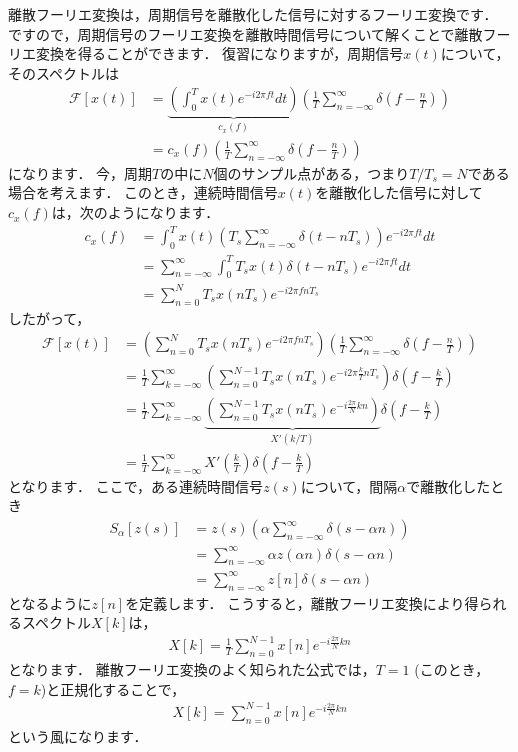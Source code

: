 離散フーリエ変換は，周期信号を離散化した信号に対するフーリエ変換です．
ですので，周期信号のフーリエ変換を離散時間信号について解くことで離散フーリエ変換を得ることができます．
復習になりますが，周期信号$x(t)$について，そのスペクトルは
\begin{align}
\mathcal{F}[x(t)] &= \underbrace{\left(\int_0^T x(t) e^{-i2\pi ft} dt \right)}_{c_x(f)} \left(\frac{1}{T} \sum_{n=-\infty}^{\infty} \delta\left(f - \frac{n}{T} \right) \right) \nonumber\\
    &= c_x(f) \left(\frac{1}{T} \sum_{n=-\infty}^{\infty} \delta\left(f - \frac{n}{T} \right) \right)
\end{align}
になります．
今，周期$T$の中に$N$個のサンプル点がある，つまり$T/T_s = N$である場合を考えます．
このとき，連続時間信号$x(t)$を離散化した信号に対して$c_x(f)$は，次のようになります．
\begin{align}
c_x(f) &= \int_0^T x(t)\left(T_s \sum_{n=-\infty}^{\infty} \delta(t - nT_s) \right) e^{-i2\pi ft} dt \nonumber\\
    &= \sum_{n=-\infty}^{\infty} \int_0^T T_s x(t) \delta(t - nT_s) e^{-i2\pi ft} dt \nonumber\\
    &= \sum_{n=0}^N T_s x(nT_s) e^{-i2\pi f nT_s}
\end{align}
したがって，
\begin{align}
\mathcal{F}[x(t)] &= \left(\sum_{n=0}^N T_s x(nT_s) e^{-i2\pi f nT_s}\right) \left(\frac{1}{T} \sum_{n=-\infty}^{\infty} \delta\left(f - \frac{n}{T} \right) \right) \nonumber\\
                  &= \frac{1}{T} \sum_{k=-\infty}^{\infty} \left(\sum_{n=0}^{N-1} T_s x(nT_s) e^{-i2\pi \frac{k}{T} nT_s}\right) \delta\left(f - \frac{k}{T} \right)\nonumber\\
                  &= \frac{1}{T} \sum_{k=-\infty}^{\infty} \underbrace{\left(\sum_{n=0}^{N-1} T_s x(nT_s) e^{-i\frac{2\pi}{N} kn}\right)}_{X'(k/T)} \delta\left(f - \frac{k}{T} \right) \nonumber\\
                  &= \frac{1}{T} \sum_{k=-\infty}^{\infty} X'\left(\frac{k}{T} \right) \delta\left(f - \frac{k}{T}\right)
\end{align}
となります．
ここで，ある連続時間信号$z(s)$について，間隔$\alpha$で離散化したとき
\begin{align}
S_{\alpha}[z(s)] &= z(s) \left(\alpha \sum_{n=-\infty}^{\infty} \delta(s - \alpha n) \right) \nonumber\\
    &= \sum_{n=-\infty}^{\infty} \alpha z(\alpha n) \delta(s - \alpha n) \nonumber\\
    &= \sum_{n=-\infty}^{\infty} z[n] \delta(s - \alpha n)
\end{align}
となるように$z[n]$を定義します．
こうすると，離散フーリエ変換により得られるスペクトル$X[k]$は，
\begin{align}
X[k] = \frac{1}{T} \sum_{n=0}^{N-1} x[n] e^{-i\frac{2\pi}{N} kn}
\end{align}
となります．
離散フーリエ変換のよく知られた公式では，$T=1$ (このとき，$f=k$)と正規化することで，
\begin{align}
X[k] = \sum_{n=0}^{N-1} x[n] e^{-i\frac{2\pi}{N} kn}
\end{align}
という風になります．

